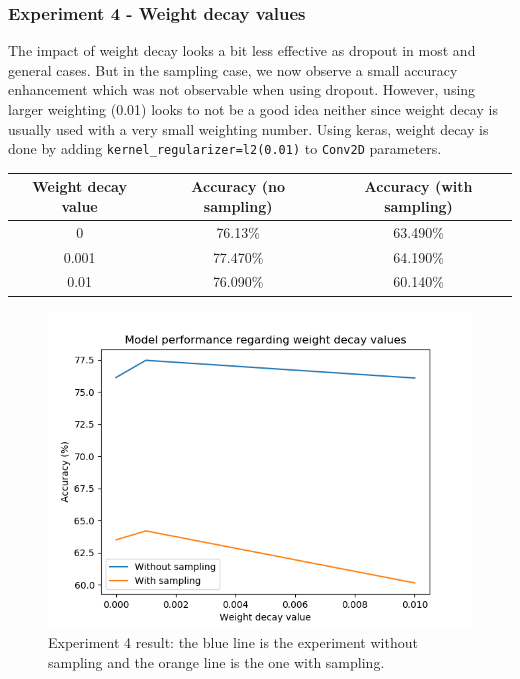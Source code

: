 \documentclass[11pt, openany]{report}
\theoremstyle{plain}
\theoremstyle{definition}
\theoremstyle{remark}
\begin{document}
\subsubsection{Experiment 4 - Weight decay values} 

The impact of weight decay looks a bit less effective as dropout in most and general cases. But in the sampling case, we now observe a small accuracy enhancement which was not observable when using dropout. However, using larger weighting (0.01) looks to not be a good idea neither since weight decay is usually used with a very small weighting number. Using keras, weight decay is done by adding \texttt{kernel\_regularizer=l2(0.01)} to \texttt{Conv2D} parameters. 

\begin{center}
\begin{tabular}{|c|c|c|}
  \hline
  Weight decay value & Accuracy (no sampling) & Accuracy (with sampling) \\
  \hline
  0 & 76.13\% &  63.490\% \\
  0.001 & 77.470\% & 64.190\% \\
  0.01 & 76.090\% & 60.140\% \\
  \hline
\end{tabular}
\end{center}

\begin{figure}[H]
  \centering
  \includegraphics[scale=0.6]{Code/figures_result/weight_decay_graph.png}
  \caption{Experiment 4 result: the blue line is the experiment without sampling and the orange line is the one with sampling.}
  \label{fig:cifar_weightdecay_res}
\end{figure}
\end{document}
